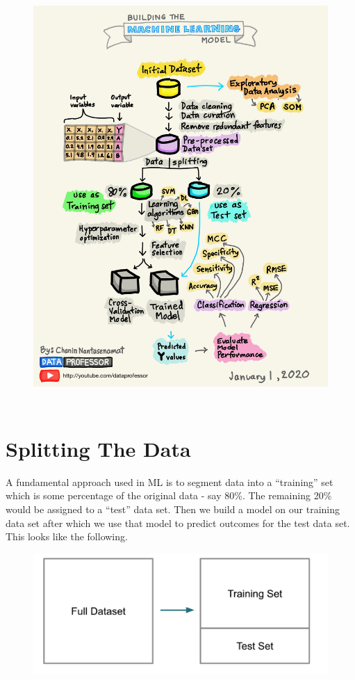 \documentclass[]{book}
\begin{document}
\begin{figure}
\centering
\includegraphics[height=6.25000in]{./PICS/sworkflow.jpg}
\caption{}
\end{figure}

\section{Splitting The Data}\label{splitting-the-data}

A fundamental approach used in ML is to segment data into a ``training''
set which is some percentage of the original data - say 80\%. The
remaining 20\% would be assigned to a ``test'' data set. Then we build a
model on our training data set after which we use that model to predict
outcomes for the test data set. This looks like the following.

\begin{figure}
\centering
\includegraphics[width=5.20833in]{./PICS/crossvalid.png}
\caption{}
\end{figure}
\end{document}
